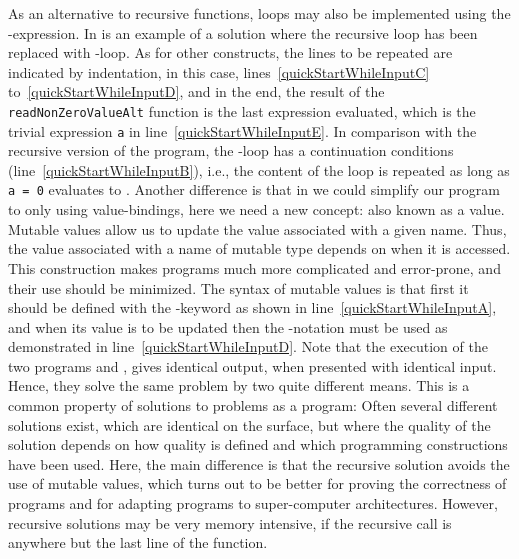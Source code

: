 \documentclass[springer.tex]{subfiles}
\begin{document}
As an alternative to recursive functions, loops may also be implemented using the -expression. In  is an example of a solution where the recursive loop has been replaced with -loop.
% 
%
As for other constructs, the lines to be repeated are indicated by indentation, in this case, lines~\ref{quickStartWhileInputC} to~\ref{quickStartWhileInputD}, and in the end, the result of the
\lstinline{readNonZeroValueAlt} function is the last expression evaluated, which is the trivial expression \lstinline{a} in line~\ref{quickStartWhileInputE}. In comparison with the recursive version of the program, the -loop has a continuation conditions (line~\ref{quickStartWhileInputB}), i.e., the content of the loop is repeated as long as \lstinline{a = 0} evaluates to . Another difference is that in  we could simplify our program to only using  value-bindings, here we need a new concept:  also known as a  value. Mutable values allow us to update the value associated with a given name. Thus, the value associated with a name of mutable type depends on when it is accessed. This construction makes programs much more complicated and error-prone, and their use should be minimized. The syntax of mutable values is that first it should be defined with the -keyword as shown in line~\ref{quickStartWhileInputA}, and when its value is to be updated then the \lexeme{<-}-notation must be used as demonstrated in line~\ref{quickStartWhileInputD}. Note that the execution of the two programs  and , gives identical output, when presented with identical input. Hence, they solve the same problem by two quite different means. This is a common property of solutions to problems as a program: Often several different solutions exist, which are identical on the surface, but where the quality of the solution depends on how quality is defined and which programming constructions have been used. Here, the main difference is that the recursive solution avoids the use of mutable values, which turns out to be better for proving the correctness of programs and for adapting programs to super-computer architectures. However, recursive solutions may be very memory intensive, if the recursive call is anywhere but the last line of the function. 
\end{document}
